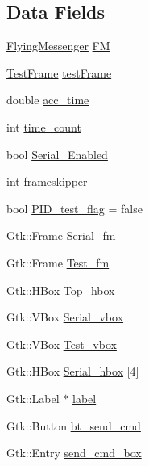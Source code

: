 \subsection*{Data Fields}
\begin{DoxyCompactItemize}
\item 
\hyperlink{class_flying_messenger}{Flying\+Messenger} \hyperlink{class_control_g_u_i_a16612b604257a888faac7a1d7e9e3e51}{FM}
\item 
\hyperlink{class_test_frame}{Test\+Frame} \hyperlink{class_control_g_u_i_a0c644077833274625d1ff044e2abdb42}{test\+Frame}
\item 
double \hyperlink{class_control_g_u_i_ae156679755c9112ad987a96449413cbb}{acc\+\_\+time}
\item 
int \hyperlink{class_control_g_u_i_a7cb0b94f14867e85d0f630fddf31d158}{time\+\_\+count}
\item 
bool \hyperlink{class_control_g_u_i_aa3364ab85cac455c12942d46cf94c7e1}{Serial\+\_\+\+Enabled}
\item 
int \hyperlink{class_control_g_u_i_affcb5dec02b4556795f4f709a6e81b25}{frameskipper}
\item 
bool \hyperlink{class_control_g_u_i_a7839defbdc6354cabaa58ceadfe926c3}{P\+I\+D\+\_\+test\+\_\+flag} = false
\item 
Gtk\+::\+Frame \hyperlink{class_control_g_u_i_ad1d02aca34fe1f740970cb85311317bf}{Serial\+\_\+fm}
\item 
Gtk\+::\+Frame \hyperlink{class_control_g_u_i_a5d8c401a0a96fd03cb6b2893e1ea9fb4}{Test\+\_\+fm}
\item 
Gtk\+::\+H\+Box \hyperlink{class_control_g_u_i_a2b17142ef5bdc8b60d9e7b2fb74c47eb}{Top\+\_\+hbox}
\item 
Gtk\+::\+V\+Box \hyperlink{class_control_g_u_i_ab9016ebf268ba945ceefaa063c74df00}{Serial\+\_\+vbox}
\item 
Gtk\+::\+V\+Box \hyperlink{class_control_g_u_i_a2ff057031f70b0d5b5948b61b55e0679}{Test\+\_\+vbox}
\item 
Gtk\+::\+H\+Box \hyperlink{class_control_g_u_i_ad4d4fc47f141bc2138d82c1634667cb5}{Serial\+\_\+hbox} \mbox{[}4\mbox{]}
\item 
Gtk\+::\+Label $\ast$ \hyperlink{class_control_g_u_i_a225d9b556218b679235d3bca6c464415}{label}
\item 
Gtk\+::\+Button \hyperlink{class_control_g_u_i_a8002683eca7855b1d49f16258ad0e889}{bt\+\_\+send\+\_\+cmd}
\item 
Gtk\+::\+Entry \hyperlink{class_control_g_u_i_a0cafb8350874db85af1fc59d21b61451}{send\+\_\+cmd\+\_\+box}

\end{DoxyCompactItemize}

